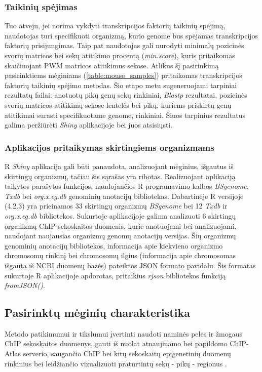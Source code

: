 \documentclass[12pt]{article}
\begin{document}
\subsubsection*{Taikinių spėjimas}
Tuo atveju, jei norima vykdyti transkripcijos faktorių taikinių spėjimą,
naudotojas turi specifikuoti organizmą, kurio genome bus spėjamas transkripcijos
faktorių prisijungimas. Taip pat naudotojas gali nurodyti minimalų pozicinės
svorių matricos bei sekų atitikimo procentą (\emph{min.score}), kuris
pritaikomas skaičiuojant PWM matricos atitikimus sekose. Atlikus šį pasirinkimą
pasirinktiems mėginiams (\ref{table:mouse_samples}) pritaikomas transkripcijos
faktorių taikinių spėjimo metodas. Šio etapo metu sugeneruojami tarpiniai
rezultatų failai: anotuotų pikų genų sekų rinkiniai, \emph{Blastp} rezultatai,
pozicinės svorių matricos atitikimų sekose lentelės bei pikų, kuriems priskirtų
genų atitikimai surasti specifikuotame genome, rinkiniai. Šiuos tarpinius
rezultatus galima per\-žiū\-rė\-ti \emph{Shiny} aplikacijoje bei juos
atsisiųsti.

\subsubsection*{Aplikacijos pritaikymas skirtingiems organizmams}
R \emph{Shiny} aplikacija gali būti panaudota, analizuojant mėginius, išgautus
iš skirtingų or\-ga\-niz\-mų, tačiau šis sąrašas yra ribotas. Realizuojant
aplikaciją taikytos parašytos funkcijos, naudojančios R programavimo kalbos
\emph{BSgenome}, \emph{Txdb} bei \emph{org.x.eg.db} genominių anotacijų
bibliotekas. Dabartinėje R versijoje (4.2.3) yra prieinamos 33 skirtingų
organizmų \emph{BSgenome} bei 12 \emph{Txdb} ir \emph{org.x.eg.db} bibliotekos.
Sukurtoje aplikacijoje galima analizuoti 6 skirtingų organizmų ChIP sekoskaitos
duomenis, kurie anotuojami bei analizuojami, naudojant naujausias organizmų
genomų anotacijų versijas. Šių organizmų genominių anotacijų bibliotekos,
informacija apie kiekvieno organizmo chromosomų rinkinį bei chromosomų ilgius
(informacija apie chromosomas išgauta iš NCBI \cite{NCBI} duomenų bazės)
pateiktos JSON formato pavidalu. Šis formatas sukurtoje
R aplikacijoje apdorotas, pritaikius \emph{rjson} \cite{RJSON} bibliotekos
funkciją \emph{fromJSON()}.

\newpage


\subsection{Pasirinktų mėginių charakteristika}
Metodo patikimumui ir tikslumui įvertinti naudoti naminės pelės ir žmogaus
ChIP se\-kos\-kai\-tos duomenys, gauti iš nuolat atnaujinamo bei papildomo
ChIP-Atlas \cite{CHIPATLAS} serverio, saugančio ChIP bei kitų sekoskaitų
epigenetinių duomenų rinkinius bei leidžiančio vizualizuoti praturtintų sekų -
pikų - regionus \cite{CHIPATLAS2}.
\end{document}
